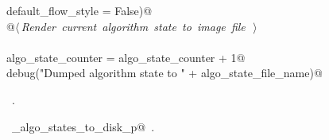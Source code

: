 \documentclass[11.5pt]{report}
\begin{document}
\begin{flushleft}
\begin{list}{}{}
\mbox{}\verb@                     default_flow_style = False)@\\
\mbox{}\verb@          @\hbox{$\langle\,${\itshape Render current algorithm state to image file}\nobreak\ {\footnotesize {}}$\,\rangle$}\verb@@\\
\mbox{}\verb@@\\
\mbox{}\verb@     algo_state_counter = algo_state_counter + 1@\\
\mbox{}\verb@     debug("Dumped algorithm state to " + algo_state_file_name)@\\
\mbox{}\verb@@{\NWsep}
\end{list}
\vspace{-1.5ex}
\footnotesize
\begin{list}{}{\setlength{\itemsep}{-\parsep}\setlength{\itemindent}{-\leftmargin}}
\item \NWtxtMacroRefIn\ .
\item \NWtxtIdentsUsed\nobreak\  \verb@write_algo_states_to_disk_p@\nobreak\ .
\item{}
\end{list}
\vspace{4ex}
\end{flushleft}


\vspace{-0.4cm}
\end{document}
